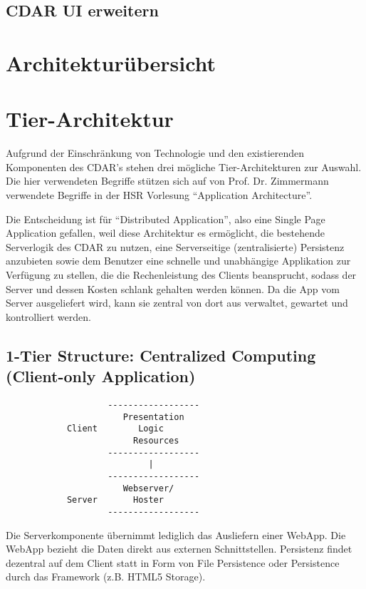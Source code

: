 			
		\subsection{CDAR UI erweitern}
		
		

	\section{Architekturübersicht}
	
	
	\section{Tier-Architektur}
		Aufgrund der Einschränkung von Technologie und den existierenden Komponenten des CDAR's stehen drei mögliche Tier-Architekturen zur Auswahl.
		Die hier verwendeten Begriffe stützen sich auf von Prof. Dr. Zimmermann verwendete Begriffe in der HSR Vorlesung "`Application Architecture"'\cite{_layers_2014}.
	
		Die Entscheidung ist für "`Distributed Application"', also eine Single Page Application gefallen, 
		weil diese Architektur es ermöglicht, die bestehende Serverlogik des CDAR zu nutzen, 
		eine Serverseitige (zentralisierte) Persistenz anzubieten sowie dem Benutzer eine schnelle und unabhängige Applikation zur Verfügung zu stellen, die die Rechenleistung des Clients beansprucht, sodass der Server und dessen Kosten schlank gehalten werden können.
		Da die App vom Server ausgeliefert wird, kann sie zentral von dort aus verwaltet, gewartet und kontrolliert werden.
		
		\subsection{1-Tier Structure: Centralized Computing (Client-only Application)}
			\begin{verbatim}
			        ------------------
			           Presentation
			Client        Logic
			             Resources
			        ------------------
			                |
			        ------------------
			           Webserver/
			Server       Hoster	
			        ------------------		
			\end{verbatim}

			Die Serverkomponente übernimmt lediglich das Ausliefern einer WebApp. 
			Die WebApp bezieht die Daten direkt aus externen Schnittstellen. 
			Persistenz findet dezentral auf dem Client statt in Form von File Persistence oder 
			Persistence durch das Framework (z.B. HTML5 Storage).
	
